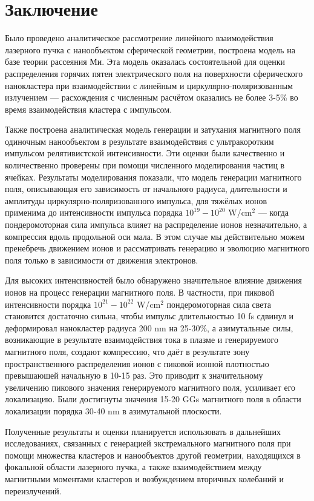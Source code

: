 \section{Заключение}

Было проведено аналитическое рассмотрение линейного взаимодействия лазерного пучка с нанообъектом сферической геометрии, построена модель на базе теории рассеяния Ми. Эта модель оказалась состоятельной для оценки распределения горячих пятен электрического поля на поверхности сферического нанокластера при взаимодействии с линейным и циркулярно-поляризованным излучением --- расхождения с численным расчётом оказались не более 3-5\% во время взаимодействия кластера с импульсом.

Также построена аналитическая модель генерации и затухания магнитного поля одиночным нанообъектом в результате взаимодействия с ультракоротким импульсом релятивистской интенсивности. Эти оценки были качественно и количественно проверены при помощи численного моделирования частиц в ячейках. Результаты моделирования показали, что модель генерации магнитного поля, описывающая его зависимость от начального радиуса, длительности и амплитуды циркулярно-поляризованного импульса, для тяжёлых ионов применима до интенсивности импульса порядка $10^{19} - 10^{20}$ W/cm$^2$ --- когда пондеромоторная сила импульса влияет на распределение ионов незначительно, а компрессия вдоль продольной оси мала. В этом случае мы действительно можем пренебречь движением ионов и рассматривать генерацию и эволюцию магнитного поля только в зависимости от движения электронов.

Для высоких интенсивностей было обнаружено значительное влияние движения ионов на процесс генерации магнитного поля. В частности, при пиковой интенсивности порядка $10^{21} - 10^{22}$ W/cm$^2$ пондеромоторная сила света становится достаточно сильна, чтобы импульс длительностью 10 fs сдвинул и деформировал нанокластер радиуса 200 nm на 25-30\%, а азимутальные силы, возникающие в результате взаимодействия тока в плазме и генерируемого магнитного поля, создают компрессию, что даёт в результате зону пространственного распределения ионов с пиковой ионной плотностью превышаюшей начальную в 10-15 раз. Это приводит к значительному увеличению пикового значения генерируемого магнитного поля, усиливает его локализацию. Были достигнуты значения 15-20 GGs магнитного поля в области локализации порядка 30-40 nm в азимутальной плоскости.

Полученные результаты и оценки планируется использовать в дальнейших исследованиях, связанных с генерацией экстремального магнитного поля при помощи множества кластеров и нанообъектов другой геометрии, находящихся в фокальной области лазерного пучка, а также взаимодействием между магнитными моментами кластеров и возбуждением вторичных колебаний и переизлучений.